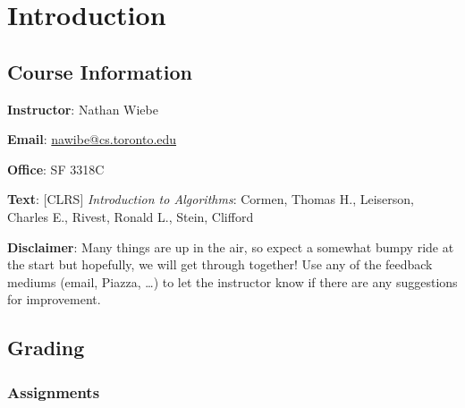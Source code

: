 \chapter{Introduction}

\section{Course Information}

\begin{listu}
    \item \textbf{Instructor}: Nathan Wiebe

    \begin{listu}
        \item \textbf{Email}: \href{mailto:nawibe@cs.toronto.edu}{nawibe@cs.toronto.edu}
        \item \textbf{Office}: SF 3318C
    \end{listu}

    \item \textbf{Text}: [CLRS] \textit{Introduction to Algorithms}: Cormen, Thomas H., Leiserson, Charles E., Rivest, Ronald L., Stein, Clifford

    

    \item \textbf{Disclaimer}: Many things are up in the air, so expect a somewhat bumpy ride at the start but hopefully, we will get through together! Use any of the feedback mediums (email, Piazza, \dots) to let the instructor know if there are any suggestions for improvement. 
\end{listu}

\section{Grading}

\subsection{Assignments}

